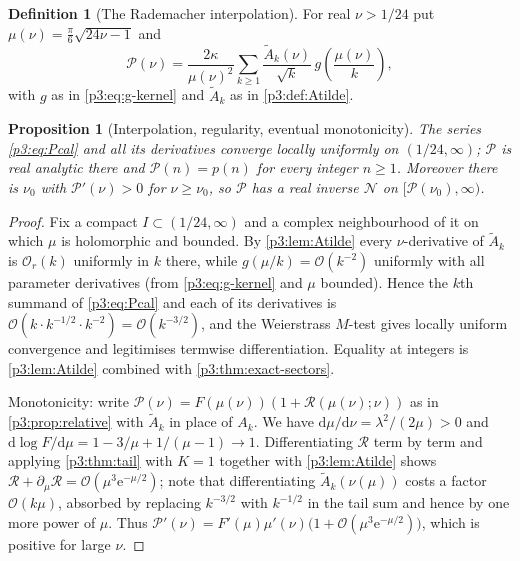 \documentclass[11pt,a4paper,oneside]{book}
\theoremstyle{plain}
\newtheorem{proposition}[theorem]{Proposition}
\theoremstyle{definition}
\newtheorem{definition}[theorem]{Definition}
\theoremstyle{remark}
\newcommand{\e}{\mathrm{e}}
\newcommand{\dd}{\mathrm{d}}
\newcommand{\bigO}{\mathcal{O}}
\begin{document}
\begin{definition}[The Rademacher interpolation]\label{p3:def:Pcal}
For real $\nu>1/24$ put $\mu(\nu)=\tfrac\pi6\sqrt{24\nu-1}$ and
\begin{equation}\label{p3:eq:Pcal}
 \mathcal{P}(\nu)=\frac{2\kappa}{\mu(\nu)^{2}}\sum_{k\ge1}
 \frac{\widetilde A_{k}(\nu)}{\sqrt k}\,g\!\left(\frac{\mu(\nu)}{k}\right),
\end{equation}
with $g$ as in \cref{p3:eq:g-kernel} and $\widetilde A_{k}$ as in \cref{p3:def:Atilde}.
\end{definition}

\begin{proposition}[Interpolation, regularity, eventual monotonicity]
\label{p3:prop:Pcal}
The series \cref{p3:eq:Pcal} and all its derivatives converge locally uniformly on
$(1/24,\infty)$; $\mathcal{P}$ is real analytic there and $\mathcal{P}(n)=p(n)$ for every integer
$n\ge1$. Moreover there is $\nu_{0}$ with $\mathcal{P}'(\nu)>0$ for $\nu\ge\nu_{0}$, so
$\mathcal{P}$ has a real inverse $\mathcal{N}$ on $[\mathcal{P}(\nu_{0}),\infty)$.
\end{proposition}

\begin{proof}
Fix a compact $I\subset(1/24,\infty)$ and a complex neighbourhood of it on which $\mu$ is
holomorphic and bounded. By \cref{p3:lem:Atilde} every $\nu$-derivative of $\widetilde A_{k}$ is
$\bigO_{r}(k)$ uniformly in $k$ there, while $g(\mu/k)=\bigO(k^{-2})$ uniformly with all
parameter derivatives (from \cref{p3:eq:g-kernel} and $\mu$ bounded). Hence the $k$th summand of
\cref{p3:eq:Pcal} and each of its derivatives is $\bigO(k\cdot k^{-1/2}\cdot
k^{-2})=\bigO(k^{-3/2})$, and the Weierstrass $M$-test gives locally uniform convergence and
legitimises termwise differentiation. Equality at integers is \cref{p3:lem:Atilde} combined with
\cref{p3:thm:exact-sectors}.

Monotonicity: write $\mathcal{P}(\nu)=F(\mu(\nu))(1+\mathcal{R}(\mu(\nu);\nu))$ as in
\cref{p3:prop:relative} with $\widetilde A_{k}$ in place of $A_{k}$. We have
$\dd\mu/\dd\nu=\lambda^{2}/(2\mu)>0$ and $\dd\log F/\dd\mu=1-3/\mu+1/(\mu-1)\to1$. Differentiating
$\mathcal{R}$ term by term and applying \cref{p3:thm:tail} with $K=1$ together with
\cref{p3:lem:Atilde} shows $\mathcal{R}+\partial_{\mu}\mathcal{R}=\bigO(\mu^{3}\e^{-\mu/2})$;
note that differentiating $\widetilde A_{k}(\nu(\mu))$ costs a factor $\bigO(k\mu)$, absorbed
by replacing $k^{-3/2}$ with $k^{-1/2}$ in the tail sum and hence by one more power of $\mu$. Thus
$\mathcal{P}'(\nu)=F'(\mu)\mu'(\nu)\bigl(1+\bigO(\mu^{3}\e^{-\mu/2})\bigr)$, which is
positive for large $\nu$.
\end{proof}
\end{document}
